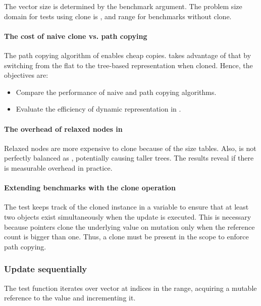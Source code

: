 The vector size is determined by the benchmark argument. The problem size domain for tests using clone is \range{[20, \kilo{20}]}, and \range{[20, \kilo{100}]} range for benchmarks without clone.

\paragraph{The cost of naive clone vs. path copying}
The path copying algorithm of \rbtree{} enables cheap copies. \pvec{} takes advantage of that by switching from the flat to the tree-based representation when cloned. Hence, the objectives are:
\begin{itemize}
    \item Compare the performance of naive and path copying algorithms.
    \item Evaluate the efficiency of dynamic representation in \pvec{}.
\end{itemize}

\paragraph{The overhead of relaxed nodes in \rrbtree{}}
Relaxed nodes are more expensive to clone because of the size tables. Also, \rrbtree{} is not perfectly balanced as \rbtree{}, potentially causing taller trees. The results reveal if there is measurable overhead in practice.

\paragraph{Extending benchmarks with the clone operation}
The test keeps track of the cloned instance in a variable to ensure that at least two objects exist simultaneously when the update is executed. This is necessary because \rc{} pointers clone the underlying value on mutation only when the reference count is bigger than one. Thus, a clone must be present in the scope to enforce path copying.

\subsubsection*{Update sequentially}
The test function iterates over vector at indices in the \range{[0, N)} range, acquiring a mutable reference to the value and incrementing it.

